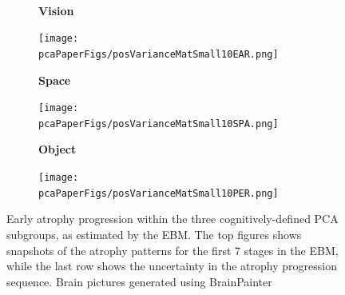 \begin{figure}
  \hspace{-1.5em}
  ~
  \hspace{-1.5em}

  
 \begin{subfigure}{0.32\textwidth}
 \centering
 {\footnotesize \textbf{Vision}\par}
 \texttt{[image: \\pcaPaperFigs/posVarianceMatSmall10EAR.png]}
 \end{subfigure}
  \begin{subfigure}{0.32\textwidth}
  \centering
  {\footnotesize \textbf{Space}\par}
 \texttt{[image: \\pcaPaperFigs/posVarianceMatSmall10SPA.png]}
 \end{subfigure}
  \begin{subfigure}{0.32\textwidth}
  \centering
  {\footnotesize \textbf{Object}\par}
 \texttt{[image: \\pcaPaperFigs/posVarianceMatSmall10PER.png]}
 \end{subfigure}
 \caption[Early atrophy progression within the three cognitively-defined PCA subgroups]{Early atrophy progression within the three cognitively-defined PCA subgroups, as estimated by the EBM. The top figures shows snapshots of the atrophy patterns for the first 7 stages in the EBM, while the last row shows the uncertainty in the atrophy progression sequence. Brain pictures generated using BrainPainter \cite{marinescu2019BrainPainter}}
 \label{fig:pcaSubgrSnap}
\end{figure}

